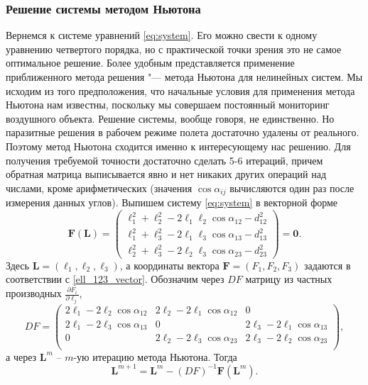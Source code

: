 \documentclass[../main.tex]{subfiles}
\begin{document}
\subsubsection{Решение системы методом Ньютона}
Вернемся к системе уравнений \eqref{eq:system}. Его можно свести к одному уравнению четвертого порядка, но с практической точки зрения это не самое оптимальное решение.
Более удобным представляется применение приближенного метода решения "--- метода Ньютона для нелинейных систем. Мы исходим из того предположения, что начальные условия для применения метода Ньютона нам известны, поскольку мы совершаем постоянный мониторинг воздушного объекта. Решение системы, вообще говоря, не единственно. Но паразитные решения в рабочем режиме полета достаточно удалены от реального. Поэтому метод Ньютона сходится именно к интересующему нас решению. Для получения требуемой точности достаточно сделать 5-6 итераций, причем обратная матрица выписывается явно и нет никаких других операций над числами, кроме арифметических (значения $\cos\alpha_{ij}$
вычисляются один раз после измерения данных углов).
Выпишем систему \eqref{eq:system} в векторной форме
\begin{equation}
  \mathbf{F} (\mathbf{L})=
  \left(
    \begin{array}{c}
      \ell_1^2+\ell_2^2-2 \ell_1 \ell_2 \cos \alpha_{12} - d_{12}^2 \\
      \ell_1^2+\ell_3^2-2 \ell_1 \ell_3 \cos \alpha_{13} - d_{13}^2 \\
      \ell_2^2+\ell_3^2-2 \ell_2 \ell_3 \cos \alpha_{23} - d_{23}^2
    \end{array}
  \right)
  =\mathbf{0}.
\label{ell_123_vector}
\end{equation}
Здесь $\mathbf{L}=(\ell_1,\ell_2,\ell_3)$, а координаты вектора $\mathbf{F}=(F_1,F_2,F_3)$ задаются в соответствии с \eqref {ell_123_vector}. Обозначим через  $DF$ матрицу из частных производных $\frac {\partial F_i} {\partial \ell_j}$,
\begin{equation}
DF=
\left(
  \begin{array}{ccc}
    2\ell_1 - 2\ell_2 \cos \alpha_{12} & 2\ell_2 - 2\ell_1 \cos \alpha_{12} & 0  \\
    2\ell_1 - 2\ell_3 \cos \alpha_{13} & 0 & 2\ell_3 - 2\ell_1 \cos \alpha_{13}  \\
    0 & 2\ell_2 - 2\ell_3 \cos \alpha_{23} & 2\ell_3 - 2\ell_2 \cos \alpha_{23}  \\
  \end{array}
\right),
\label {DF}
\end{equation}
а через $\mathbf{L}^m$ -- $m$-ую итерацию метода Ньютона. Тогда
\begin{equation}
  \mathbf{L}^{m+1}=\mathbf{L}^{m} - (DF)^{-1} \mathbf{F}(\mathbf{L}^{m}).
\label {Newton_vector}
\end{equation}
\end{document}
